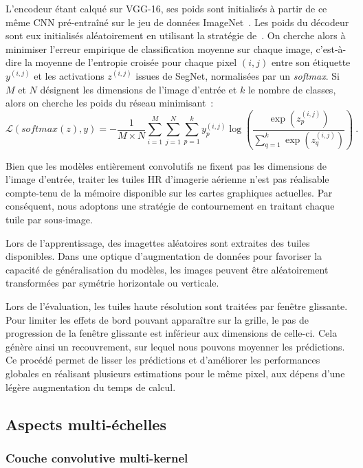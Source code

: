 L'encodeur étant calqué sur VGG-16, ses poids sont initialisés à partir de ce même CNN pré-entraîné sur le jeu de données ImageNet~\cite{deng_imagenet_2009}. Les poids du décodeur sont eux initialisés aléatoirement en utilisant la stratégie de~\citet{he_delving_2015}. On cherche alors à minimiser l'erreur empirique de classification moyenne sur chaque image, c'est-à-dire la moyenne de l'entropie croisée pour chaque pixel $(i,j)$ entre son étiquette $y^{(i,j)}$ et les activations $z^{(i,j)}$ issues de SegNet, normalisées par un \emph{softmax}. Si $M$ et $N$ désignent les dimensions de l'image d'entrée et $k$ le nombre de classes, alors on cherche les poids du réseau minimisant~:
\begin{equation}
\mathcal{L}(\mathit{softmax}(z),y) = - \frac{1}{M \times N} \sum_{i=1}^M \sum_{j=1}^N \sum_{p=1}^k y_p^{(i,j)} \log\left(\frac{\exp(z_p^{(i,j)})}{\sum\limits_{q=1}^k \exp(z_q^{(i,j)})}\right)~.
\end{equation}


Bien que les modèles entièrement convolutifs ne fixent pas les dimensions de l'image d'entrée, traiter les tuiles \gls{HR} d'imagerie aérienne n'est pas réalisable compte-tenu de la mémoire disponible sur les cartes graphiques actuelles. Par conséquent, nous adoptons une stratégie de contournement en traitant chaque tuile par sous-image.

Lors de l'apprentissage, des imagettes aléatoires sont extraites des tuiles disponibles. Dans une optique d'augmentation de données pour favoriser la capacité de généralisation du modèles, les images peuvent être aléatoirement transformées par symétrie horizontale ou verticale.

Lors de l'évaluation, les tuiles haute résolution sont traitées par fenêtre glissante. Pour limiter les effets de bord pouvant apparaître sur la grille, le pas de progression de la fenêtre glissante est inférieur aux dimensions de celle-ci. Cela génère ainsi un recouvrement, sur lequel nous pouvons moyenner les prédictions. Ce procédé permet de lisser les prédictions et d'améliorer les performances globales en réalisant plusieurs estimations pour le même pixel, aux dépens d'une légère augmentation du temps de calcul.

\subsection{Aspects multi-échelles}

\subsubsection{Couche convolutive multi-kernel}

